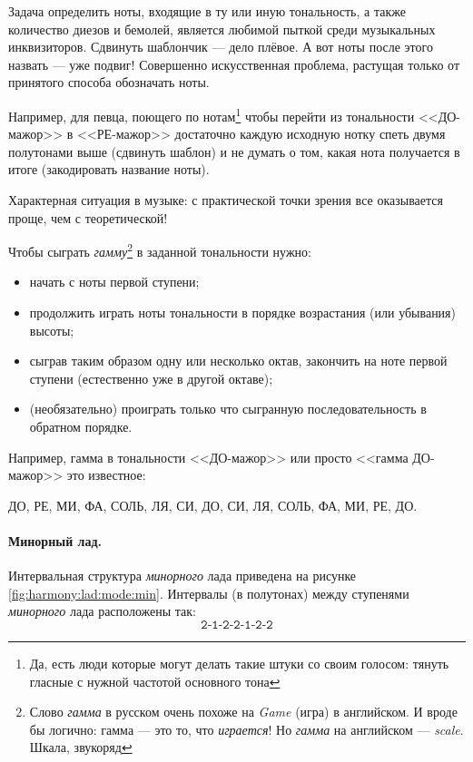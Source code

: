 Задача определить ноты, входящие в ту или иную тональность, а также количество диезов и бемолей, является любимой пыткой среди музыкальных инквизиторов. Сдвинуть шаблончик --- дело плёвое. А вот ноты после этого назвать --- уже подвиг! Совершенно искусственная проблема, растущая только от принятого способа обозначать ноты.

Например, для певца, поющего по нотам\footnote{Да, есть люди которые могут делать такие штуки со своим голосом: тянуть гласные с нужной частотой основного тона} чтобы перейти из тональности <<ДО-мажор>> в <<РЕ-мажор>> достаточно каждую исходную нотку спеть двумя полутонами выше (сдвинуть шаблон) и не думать о том, какая нота получается в итоге (закодировать название ноты).

Характерная ситуация в музыке: с практической точки зрения все оказывается проще, чем с теоретической!

Чтобы сыграть \emph{гамму}\footnote{Слово \emph{гамма} в русском очень похоже на \emph{Game} (игра) в английском. И вроде бы логично: гамма --- это то, что \emph{играется}! Но \emph{гамма} на английском --- \emph{scale}. Шкала, звукоряд} в заданной тональности нужно:
\begin{itemize}
    \item начать с ноты первой ступени;
    \item продолжить играть ноты тональности в порядке возрастания (или убывания) высоты;
    \item сыграв таким образом одну или несколько октав, закончить на ноте первой ступени (естественно уже в другой октаве); 
    \item (необязательно) проиграть только что сыгранную последовательность в обратном порядке.
\end{itemize}

Например, гамма в тональности <<ДО-мажор>> или просто <<гамма ДО-мажор>> это известное: 
\begin{center}
    ДО, РЕ, МИ, ФА, СОЛЬ, ЛЯ, СИ, ДО, СИ, ЛЯ, СОЛЬ, ФА, МИ, РЕ, ДО.
\end{center}


\paragraph{Минорный лад.} Интервальная структура \emph{минорного} лада приведена на рисунке \ref{fig:harmony:lad:mode:min}. Интервалы (в полутонах) между ступенями \emph{минорного} лада расположены так:
\[
    \texttt{2-1-2-2-1-2-2}
\]

